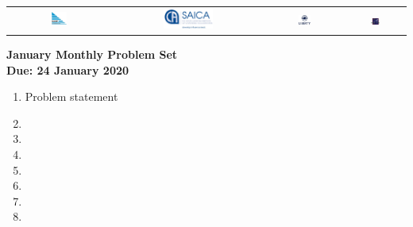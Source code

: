 \documentclass{article}
\begin{document}
\setlength{\tabcolsep}{0.015\textwidth}
\begin{center} \begin{tabular}{cccc}
	\includegraphics[width=0.16\textwidth]{SAMF_logo.jpg} &
	\includegraphics[width=0.35\textwidth]{SAICA_logo.jpg} &
	\includegraphics[width=0.18\textwidth]{Liberty_logo.jpg} &
	\includegraphics[width=0.18\textwidth]{SAMO2019.png}
\end{tabular} \end{center}


\bigskip \bigskip

\begin{center}
\textbf{\Large January Monthly Problem Set}
\\ \vspace{1em}
\textbf{\large Due: 24 January 2020}
\end{center}

\begin{enumerate}[1.]

\vspace{6pt}
\item %
Problem statement


\vspace{6pt}
\item


\vspace{6pt}
\item


\vspace{6pt}
\item


\vspace{6pt}
\item


\vspace{6pt}
\item


\vspace{6pt}
\item


\vspace{6pt}
\item


\end{enumerate}
\end{document}
